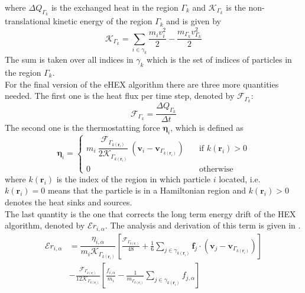\documentclass[12pt]{article}
\newcommand{\GammaK}{{\Gamma_k}}
\begin{document}
where $\Delta Q_{\Gamma_k}$ is the exchanged heat in the region $\Gamma_k$ and $\mathcal{K}_{\Gamma_k}$ is the non-translational kinetic energy of the
region $\Gamma_k$ and is given by
\begin{equation}
    \label{eq:kineticK}
    \mathcal{K}_{\Gamma_k} = \sum_{i \in \gamma_k} \frac{m_i v_i^2}{2} - \frac{m_{\Gamma_k}v_{\Gamma_k}^2}{2}
\end{equation}
The sum is taken over all indices in $\gamma_k$ which is the set of indices of particles in the region $\Gamma_k$.\\
For the final version of the eHEX algorithm there are three more quantities needed. The first one is the heat flux per time step, denoted by 
$\mathcal{F}_\GammaK$:
\begin{equation}
    \mathcal{F}_\GammaK = \frac{\Delta Q_\GammaK}{\Delta t}
\end{equation}
The second one is the thermostatting force $\boldsymbol{\eta}_i$, which is defined as
\begin{equation}
    \boldsymbol{\eta}_i = 
    \begin{cases}
        m_i \ \dfrac{{\mathcal{F}_{\Gamma_{k(\mathbf{r}_i)}}}}{{2\mathcal{K}_{\Gamma_{k(\mathbf{r}_i)}}}} \
        \left(\mathbf{v}_i - \mathbf{v}_{\Gamma_{k(\mathbf{r}_i)}}\right)
        & \quad \text{if } k(\mathbf{r}_i) > 0 \\
        0 & \quad \text{otherwise}
    \end{cases}
\end{equation}
where $k(\mathbf{r}_i)$ is the index of the region in which particle $i$ located, i.e. $k(\mathbf{r}_i) = 0$ means that the particle is in a Hamiltonian
region and $k(\mathbf{r}_i) > 0$ denotes the heat sinks and sources.\\
The last quantity is the one that corrects the long term energy drift of the HEX algorithm, denoted by $\mathcal{E}{r}_{i,\alpha}$.
The analysis and derivation of this term is given in \cite{Wirnsberger2015}.
\begin{equation}
    \label{eq:bigeps}
    \begin{aligned}
        \mathcal{E}{r}_{i,\alpha} &= \dfrac{\eta_{i,\alpha}}{m_i\mathcal{K}_{\Gamma_{k(\mathbf{r}_i)}}} \left[
        \frac{\mathcal{F}_{\Gamma_{k(\mathbf{r}_i)}}}{48} + \frac{1}{6} \sum_{j\in\gamma_{k(\mathbf{r}_i)}} \mathbf{f}_j \cdot \left(\mathbf{v}_j - 
            \mathbf{v}_{\Gamma_{k(\mathbf{r}_i)}}\right)\right] \\
            &- \frac{\mathcal{F}_{\Gamma_{k(\mathbf{r}_i)}}}{12\mathcal{K}_{\Gamma_{k(\mathbf{r}_i)}}} \left[
            \frac{f_{i,\alpha}}{m_i} - \frac{1}{m_{\Gamma_{k(\mathbf{r}_i)}}} \sum_{j\in\gamma_{k(\mathbf{r}_i)}}f_{j,\alpha}\right]
    \end{aligned}
\end{equation}
\end{document}
